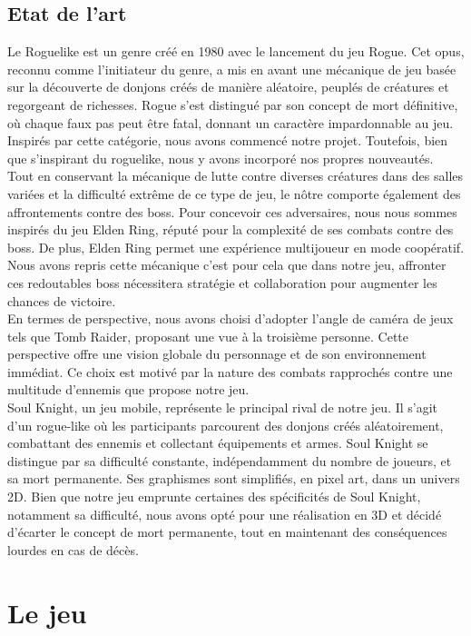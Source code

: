 \documentclass{article}
\begin{document}
\subsection{Etat de l'art}
Le Roguelike est un genre créé en 1980 avec le lancement du jeu Rogue. Cet opus, reconnu comme l'initiateur du genre, a mis en avant une mécanique de jeu basée sur la découverte de donjons créés de manière aléatoire, peuplés de créatures et regorgeant de richesses. Rogue s'est distingué par son concept de mort définitive, où chaque faux pas peut être fatal, donnant un caractère impardonnable au jeu. Inspirés par cette catégorie, nous avons commencé notre projet. Toutefois, bien que s'inspirant du roguelike, nous y avons incorporé nos propres nouveautés.\\

Tout en conservant la mécanique de lutte contre diverses créatures dans des salles variées et la difficulté extrême de ce type de jeu, le nôtre comporte également des affrontements contre des boss. Pour concevoir ces adversaires, nous nous sommes inspirés du jeu Elden Ring, réputé pour la complexité de ses combats contre des boss. De plus, Elden Ring permet une expérience multijoueur en mode coopératif. Nous avons repris cette mécanique c’est pour cela que dans notre jeu, affronter ces redoutables boss nécessitera stratégie et collaboration pour augmenter les chances de victoire.\\

En termes de perspective, nous avons choisi d'adopter l'angle de caméra de jeux tels que Tomb Raider, proposant une vue à la troisième personne. Cette perspective offre une vision globale du personnage et de son environnement immédiat. Ce choix est motivé par la nature des combats rapprochés contre une multitude d'ennemis que propose notre jeu.\\

Soul Knight, un jeu mobile, représente le principal rival de notre jeu. Il s'agit d'un rogue-like où les participants parcourent des donjons créés aléatoirement, combattant des ennemis et collectant équipements et armes. Soul Knight se distingue par sa difficulté constante, indépendamment du nombre de joueurs, et sa mort permanente. Ses graphismes sont simplifiés, en pixel art, dans un univers 2D.
Bien que notre jeu emprunte certaines des spécificités de Soul Knight, notamment sa difficulté, nous avons opté pour une réalisation en 3D et décidé d'écarter le concept de mort permanente, tout en maintenant des conséquences lourdes en cas de décès.
\section{Le jeu}
\end{document}
